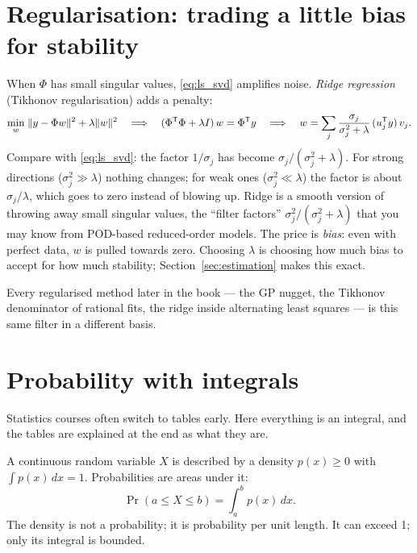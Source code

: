 \section{Regularisation: trading a little bias for stability}
\label{sec:ridge}

When $\Phi$ has small singular values, \eqref{eq:ls_svd} amplifies noise. \emph{Ridge regression} (Tikhonov
regularisation) adds a penalty:
\begin{equation}
  \min_w \; \lVert y - \Phi w\rVert^2 + \lambda \lVert w\rVert^2
  \quad\Longrightarrow\quad
  (\Phi^{\mathsf{T}}\Phi + \lambda I)\, w = \Phi^{\mathsf{T}} y
  \quad\Longrightarrow\quad
  w = \sum_j \frac{\sigma_j}{\sigma_j^2 + \lambda}\, (u_j^{\mathsf{T}} y)\, v_j .
  \label{eq:ridge}
\end{equation}
Compare with \eqref{eq:ls_svd}: the factor $1/\sigma_j$ has become $\sigma_j/(\sigma_j^2+\lambda)$. For strong
directions ($\sigma_j^2 \gg \lambda$) nothing changes; for weak ones ($\sigma_j^2 \ll \lambda$) the factor is about
$\sigma_j/\lambda$, which goes to zero instead of blowing up. Ridge is a smooth version of throwing away small
singular values, the ``filter factors'' $\sigma_j^2/(\sigma_j^2+\lambda)$ that you may know from POD-based
reduced-order models. The price is \emph{bias}: even with perfect data, $w$ is pulled towards zero. Choosing $\lambda$
is choosing how much bias to accept for how much stability; Section~\ref{sec:estimation} makes this exact.

Every regularised method later in the book --- the GP nugget, the Tikhonov denominator of rational fits, the ridge
inside alternating least squares --- is this same filter in a different basis.

\section{Probability with integrals}
\label{sec:prob}

Statistics courses often switch to tables early. Here everything is an integral, and the tables are explained at
the end as what they are.

\begin{definition}[Density]
A continuous random variable $X$ is described by a density $p(x) \ge 0$ with $\int p(x)\,dx = 1$. Probabilities are
areas under it:
\begin{equation}
  \Pr(a \le X \le b) = \int_a^b p(x)\, dx .
\end{equation}
The density is not a probability; it is probability per unit length. It can exceed 1; only its integral is bounded.
\end{definition}

